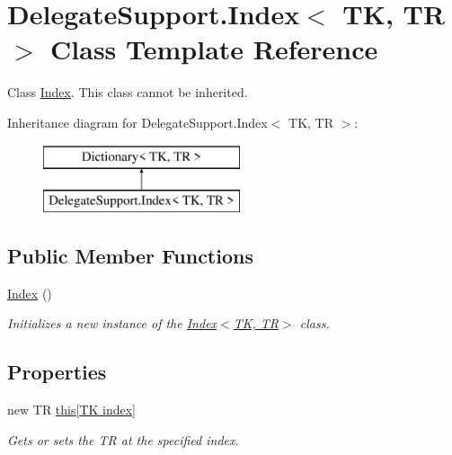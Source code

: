 \hypertarget{class_delegate_support_1_1_index}{}\section{Delegate\+Support.\+Index$<$ TK, TR $>$ Class Template Reference}
\label{class_delegate_support_1_1_index}


Class \hyperlink{class_delegate_support_1_1_index}{Index}. This class cannot be inherited.  


Inheritance diagram for Delegate\+Support.\+Index$<$ TK, TR $>$\+:\begin{figure}[H]
\begin{center}
\leavevmode
\includegraphics[height=2.000000cm]{class_delegate_support_1_1_index}
\end{center}
\end{figure}
\subsection*{Public Member Functions}
\begin{DoxyCompactItemize}
\item 
\hyperlink{class_delegate_support_1_1_index_a7d8202fe76720a1deb3751b45d1409ff}{Index} ()
\begin{DoxyCompactList}\small\item\em Initializes a new instance of the \hyperlink{class_delegate_support_1_1_index_a7d8202fe76720a1deb3751b45d1409ff}{Index$<$\+T\+K, T\+R$>$} class. \end{DoxyCompactList}\end{DoxyCompactItemize}
\subsection*{Properties}
\begin{DoxyCompactItemize}
\item 
new TR \hyperlink{class_delegate_support_1_1_index_a0d0e0be0a9e6aa092055fe2282c6e64b}{this\mbox{[}\+T\+K index\mbox{]}}
\begin{DoxyCompactList}\small\item\em Gets or sets the TR at the specified index. \end{DoxyCompactList}\end{DoxyCompactItemize}


